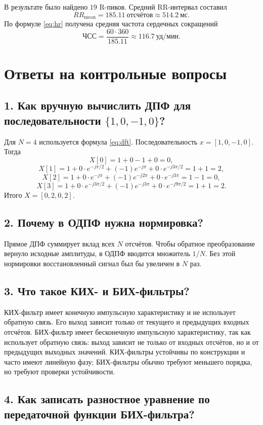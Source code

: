 \documentclass[a4paper,12pt]{article}
\begin{document}
В результате было найдено $19$ R-пиков. Средний RR-интервал составил
\[
    RR_{\text{mean}} = 185.11~\text{отсчётов} \approx 514.2~\text{мс}.
\]
По формуле \eqref{eq:hr} получена средняя частота сердечных сокращений
\[
    \text{ЧСС} = \frac{60\cdot 360}{185.11} \approx 116.7~\text{уд/мин}.
\]

\FloatBarrier

\section{Ответы на контрольные вопросы}

\subsection*{1. Как вручную вычислить ДПФ для последовательности \texorpdfstring{$\{1,0,-1,0\}$}{\{1,0,-1,0\}}?}

Для $N=4$ используется формула \eqref{eq:dft}. Последовательность $x=[1,0,-1,0]$. Тогда
\[
X[0]=1+0-1+0=0,
\]
\[
X[1]=1+0\cdot e^{-j\pi/2}+(-1)e^{-j\pi}+0\cdot e^{-j3\pi/2}=1+1=2,
\]
\[
X[2]=1+0\cdot e^{-j\pi}+(-1)e^{-j2\pi}+0\cdot e^{-j3\pi}=1-1=0,
\]
\[
X[3]=1+0\cdot e^{-j3\pi/2}+(-1)e^{-j3\pi}+0\cdot e^{-j9\pi/2}=1+1=2.
\]
Итого $X=[0,2,0,2]$.

\subsection*{2. Почему в ОДПФ нужна нормировка?}

Прямое ДПФ суммирует вклад всех $N$ отсчётов. Чтобы обратное преобразование вернуло исходные амплитуды, в ОДПФ вводится множитель $1/N$. Без этой нормировки восстановленный сигнал был бы увеличен в $N$ раз.

\subsection*{3. Что такое КИХ- и БИХ-фильтры?}

КИХ-фильтр имеет конечную импульсную характеристику и не использует обратную связь. Его выход зависит только от текущего и предыдущих входных отсчётов. БИХ-фильтр имеет бесконечную импульсную характеристику, так как использует обратную связь: выход зависит не только от входных отсчётов, но и от предыдущих выходных значений. КИХ-фильтры устойчивы по конструкции и часто имеют линейную фазу; БИХ-фильтры обычно требуют меньшего порядка, но требуют проверки устойчивости.

\subsection*{4. Как записать разностное уравнение по передаточной функции БИХ-фильтра?}
\end{document}
